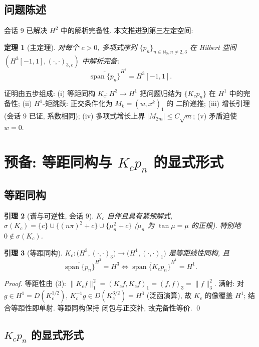 \documentclass[UTF8]{ctexart}
\newtheorem{theorem}{定理}[section]
\newtheorem{lemma}[theorem]{引理}
\begin{document}
\subsection{问题陈述}

会话 9 已解决 $H^2$ 中的解析完备性. 本文推进到第三左定空间:

\begin{theorem}[主定理]
对每个 $c > 0$, 多项式序列 $\{p_n\}_{n \in \mathbb{N}_0, n \neq 2,3}$
在 Hilbert 空间 $(H^3[-1,1], (\cdot,\cdot)_{3,c})$ 中解析完备:
\[
	\overline{\operatorname{span}\{ p_n \}}^{H^3} = H^3[-1,1].
\]
\end{theorem}

证明由五步组成: (i) 等距同构 $K_c: H^3 \to H^1$ 把问题归结为 $\{K_c p_n\}$
在 $H^1$ 中的完备性; (ii) $H^1$-矩跳跃: 正交条件化为 $M_k = (w, x^k)_1$ 的
二阶递推; (iii) 增长引理 (会话 9 已证, 系数相同); (iv) 多项式增长上界
$|M_{2m}| \leq C\sqrt{m}$; (v) 矛盾迫使 $w = 0$.

\section{预备: 等距同构与 \texorpdfstring{$K_c p_n$}{Kc pn} 的显式形式}

\subsection{等距同构}

\begin{lemma}[谱与可逆性, 会话 9]
$K_c$ 自伴且具有紧预解式, $\sigma(K_c) = \{c\} \cup \{(n\pi)^2 + c\}
\cup \{\mu_n^2 + c\}$ ($\mu_n$ 为 $\tan\mu = \mu$ 的正根). 特别地 $0 \notin \sigma(K_c)$.
\end{lemma}

\begin{lemma}[等距同构]
$K_c: \bigl( H^3, (\cdot,\cdot)_3 \bigr) \to \bigl( H^1, (\cdot,\cdot)_1 \bigr)$
是等距线性同构, 且
\[
	\overline{\operatorname{span}\{ p_n \}}^{H^3} = H^3
	\iff
	\overline{\operatorname{span}\{ K_c p_n \}}^{H^1} = H^1 .
\]
\end{lemma}

\begin{proof}
等距性由 (3): $\|K_c f\|_1^2 = (K_c f, K_c f)_1 = (f, f)_3 = \|f\|_3^2$.
满射: 对 $g \in H^1 = D(K_c^{1/2})$, $K_c^{-1} g \in D(K_c^{3/2}) = H^3$
(泛函演算), 故 $K_c$ 的像覆盖 $H^1$; 结合等距性即单射. 等距同构保持
闭包与正交补, 故完备性等价. \qed
\end{proof}

\subsection{\texorpdfstring{$K_c p_n$}{Kc pn} 的显式形式}
\end{document}
